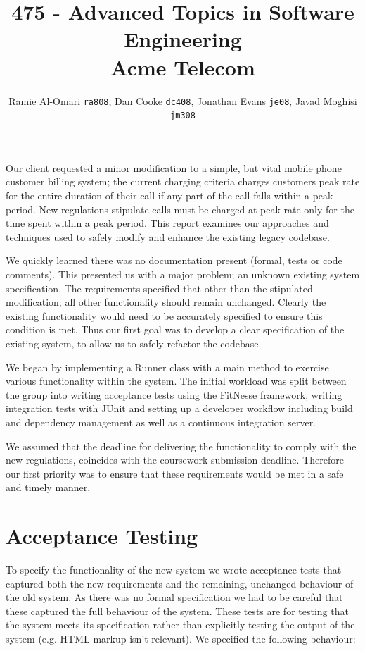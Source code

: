\documentclass[a4paper,11pt]{article}
\title{475 - Advanced Topics in Software Engineering \\ Acme Telecom}
\author{Ramie Al-Omari \texttt{ra808}, Dan Cooke \texttt{dc408}, Jonathan Evans \texttt{je08}, Javad Moghisi \texttt{jm308}}
\begin{document}
\maketitle

Our client requested a minor modification to a simple, but vital mobile phone customer billing system; the current charging criteria charges customers peak rate for the entire duration of their call if any part of the call falls within a peak period. New regulations stipulate calls must be charged at peak rate only for the time spent within a peak period. This report examines our approaches and techniques used to safely modify and enhance the existing legacy codebase.

We quickly learned there was no documentation present (formal, tests or code comments). This presented us with a major problem; an unknown existing system specification. The requirements specified that other than the stipulated modification, all other functionality should remain unchanged. Clearly the existing functionality would need to be accurately specified to ensure this condition is met. Thus our first goal was to develop a clear specification of the existing system, to allow us to safely refactor the codebase.

We began by implementing a Runner class with a main method to exercise various functionality within the system. The initial workload was split between the group into writing acceptance tests using the FitNesse framework, writing integration tests with JUnit and setting up a developer workflow including build and dependency management as well as a continuous integration server.

We assumed that the deadline for delivering the functionality to comply with the new regulations, coincides with the coursework submission deadline. Therefore our first priority was to ensure that these requirements would be met in a safe and timely manner.


\section{Acceptance Testing}
To specify the functionality of the new system we wrote acceptance tests that captured both the new requirements and the remaining, unchanged behaviour of the old system. As there was no formal specification we had to be careful that these captured the full behaviour of the system. These tests are for testing that the system meets its specification rather than explicitly testing the output of the system (e.g. HTML markup isn't relevant). We specified the following behaviour:
\end{document}

